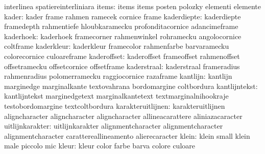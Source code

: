                            interlinea                spatiereinterliniara
                    items: items                     items
                           posten                    polozky
                           elementi                  elemente
                    kader: kader                     frame
                           rahmen                    ramecek
                           cornice                   frame
              kaderdiepte: kaderdiepte               framedepth
                           rahmentiefe               hloubkaramecku
                           profonditacornice         adancimeframe
                kaderhoek: kaderhoek                 framecorner
                           rahmenwinkel              rohramecku
                           angolocornice             coltframe
               kaderkleur: kaderkleur                framecolor
                           rahmenfarbe               barvaramecku
                           colorecornice             culoareframe
              kaderoffset: kaderoffset               frameoffset
                           rahmenoffset              offsetramecku
                           offsetcornice             offsetframe
              kaderstraal: kaderstraal               frameradius
                           rahmenradius              polomerramecku
                           raggiocornice             razaframe
                 kantlijn: kantlijn                  marginedge
                           marginalkante             textovahrana
                           bordomargine              coltbordura
            kantlijntekst: kantlijntekst             marginedgetext
                           marginalkantetext         textmarginalnihookraje
                           testobordomargine         textcoltbordura
        karakteruitlijnen: karakteruitlijnen         aligncharacter
                           aligncharacter            aligncharacter
                           allineacarattere          aliniazacaracter %
          uitlijnkarakter: uitlijnkarakter           alignmentcharacter
                           alignmentcharacter        alignmentcharacter
                           carattereallineamento     alierecaracter %
                    klein: klein                     small
                           klein                     male
                           piccolo                   mic
                    kleur: kleur                     color
                           farbe                     barva
                           colore                    culoare
